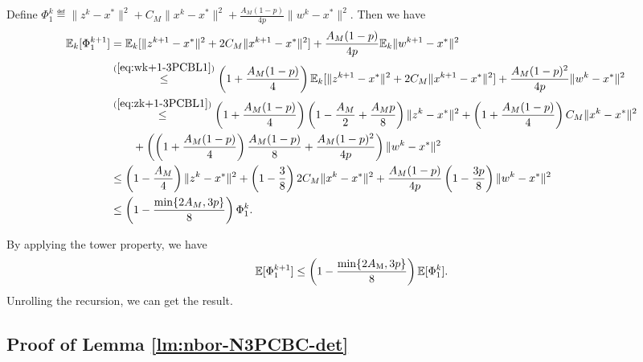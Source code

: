 \documentclass[11pt]{article}
\begin{document}
	Define $\Phi_1^k \eqdef \|z^k-x^*\|^2 + C_M\|x^k-x^*\|^2 + \frac{A_M(1-p)}{4p} \|w^k-x^*\|^2$. Then we have 
	\begin{align*}
		\mathbb{E}_k[\Phi_1^{k+1}] & = \mathbb{E}_k  [\|z^{k+1}-x^*\|^2 + 2C_M \|x^{k+1}-x^*\|^2 ] + \frac{A_M(1-p)}{4p} \mathbb{E}_k\|w^{k+1}-x^*\|^2 \\ 
		& \overset{(\ref{eq:wk+1-3PCBL1})}{\leq} \left(  1 + \frac{A_M(1-p)}{4}  \right) \mathbb{E}_k  [\|z^{k+1}-x^*\|^2 + 2C_M \|x^{k+1}-x^*\|^2 ] + \frac{A_M(1-p)^2}{4p} \|w^k-x^*\|^2 \\ 
		& \overset{(\ref{eq:zk+1-3PCBL1})}{\leq} \left(  1 + \frac{A_M(1-p)}{4}  \right) \left(  1 - \frac{A_M}{2} + \frac{A_M p}{8}  \right) \|z^k-x^*\|^2 + \left(  1 + \frac{A_M(1-p)}{4}  \right) C_M \|x^k-x^*\|^2 \\ 
		& \qquad + \left(  \left(  1 + \frac{A_M(1-p)}{4}  \right) \frac{A_M(1-p)}{8} +  \frac{A_M(1-p)^2}{4p}  \right) \|w^k-x^*\|^2 \\ 
		& \leq \left(  1 - \frac{A_M}{4}  \right) \|z^k-x^*\|^2 + \left(  1 - \frac{3}{8}  \right) 2C_M \|x^k-x^*\|^2 + \frac{A_M(1-p)}{4p} \left(  1- \frac{3p}{8}  \right) \|w^k-x^*\|^2 \\ 
		& \leq \left(  1 - \frac{\min\{2A_M, 3p\}}{8}  \right) \Phi_1^k. 
	\end{align*}
	
	By applying the tower property, we have 
	$$
	\mathbb{E} [\Phi^{k+1}_1]  \leq \left(  1 - \frac{\min\{  2A_{\rm M}, 3p  \}}{8}  \right) \mathbb{E}[\Phi^k_1]. 
	$$
	Unrolling the recursion, we can get the result. 
	
	
	
	
	
	\subsection{Proof of Lemma \ref{lm:nbor-N3PCBC-det}}
	
\end{document}

